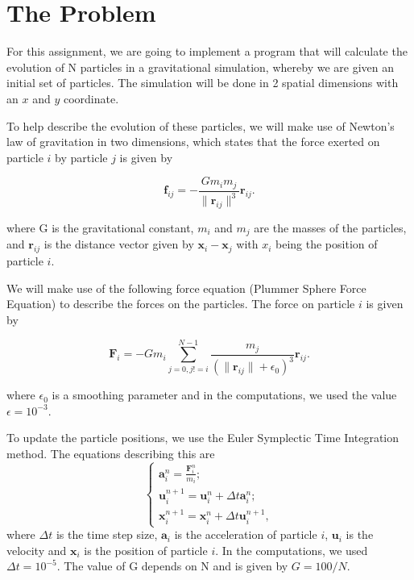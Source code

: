 \section{The Problem}
For this assignment, we are going to implement a program that will calculate the evolution of N particles in a gravitational simulation, whereby we are given an initial set of particles. The simulation will be done in 2 spatial dimensions with an $x$ and $y$ coordinate.

To help describe the evolution of these particles, we will make use of Newton's law of gravitation in two dimensions, which states that the force exerted on particle $i$ by particle $j$ is given by

    $$\boldsymbol{f}_{ij} = -\frac{Gm_{i}m_{j}}{\|\boldsymbol{r}_{ij}\|^{3}}\boldsymbol{r}_{ij}.$$

where G is the gravitational constant, $m_{i}$ and $m_{j}$ are the masses of the particles, and $\boldsymbol{r}_{ij}$ is the distance vector given by $\boldsymbol{x}_{i} -\boldsymbol{x}_{j}$ with $x_{i}$ being the position of particle $i$.

We will make use of the following force equation (Plummer Sphere Force Equation) to describe the forces on the particles. The force on particle $i$ is given by

    $$\boldsymbol{F}_{i} = -Gm_{i}\sum_{j = 0, j != i}^{N-1}\frac{m_{j}}{(\|\boldsymbol{r}_{ij}\| + \epsilon_{0})^{3}}\boldsymbol{r}_{ij}.$$

where $\epsilon_{0}$ is a smoothing parameter and in the computations, we used the value $\epsilon = 10^{-3}$.

To update the particle positions, we use the Euler Symplectic Time Integration method. The equations describing this are
$$
\begin{cases}
    \boldsymbol{a}_{i}^{n} = \frac{\boldsymbol{F}_{i}^{n}}{m_{i}};
    \\
    \boldsymbol{u}_{i}^{n+1} = \boldsymbol{u}_{i}^{n} + \Delta t\boldsymbol{a}_{i}^{n};
    \\
    \boldsymbol{x}_{i}^{n+1} = \boldsymbol{x}_{i}^{n} + \Delta t\boldsymbol{u}_{i}^{n+1},
\end{cases}
$$
where $\Delta t$ is the time step size, $\boldsymbol{a}_{i}$ is the acceleration of particle $i$, $\boldsymbol{u}_{i}$ is the velocity and $\boldsymbol{x}_{i}$ is the position of particle $i$. In the computations, we used $\Delta t = 10^{-5}$. The value of G depends on N and is given by $G = 100/N$.
\np
